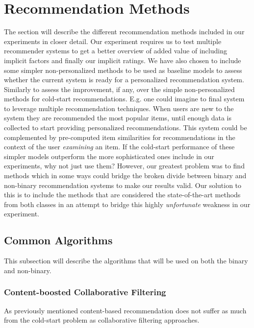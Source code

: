 
\section{Recommendation Methods}

The section will describe the different recommendation methods included in our experiments in closer detail.
Our experiment requires us to test multiple recommender systems to get a better overview of added value of including implicit
factors and finally our implicit ratings. We have also chosen to include some simpler non-personalized
methods to be used as baseline models to assess whether the current system is ready for a personalized recommendation
system. Similarly to assess the improvement, if any, over the simple non-personalized methods for cold-start recommendations.
E.g. one could imagine to final system to leverage multiple recommendation techniques. When users are new to the system they
are recommended the most popular items, until enough data is collected to start providing personalized recommendations.
This system could be complemented by pre-computed item similarities for recommendations in the context of the user
\emph{examining} an item. If the cold-start performance of these simpler models outperform the more sophisticated ones
include in our experiments, why not just use them? However, our greatest problem was to find methods which in some ways
could bridge the broken divide between binary and non-binary recommendation systems to make our results valid. Our
solution to this is to include the methods that are considered the state-of-the-art methods from both classes in
an attempt to bridge this highly \emph{unfortunate} weakness in our experiment.

\subsection{Common Algorithms}

This subsection will describe the algorithms that will be used on both the binary and non-binary.

\subsubsection{Content-boosted Collaborative Filtering}

As previously mentioned content-based recommendation does not suffer as much from the cold-start problem as
collaborative filtering approaches.

